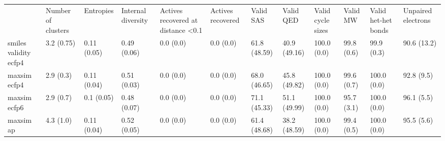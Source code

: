 \begin{tabular}{llllllllllll}
 & Number of clusters & Entropies & Internal diversity & Actives recovered at distance <0.1 & Actives recovered & Valid SAS & Valid QED & Valid cycle sizes & Valid MW & Valid het-het bonds & Unpaired electrons \\
smiles validity ecfp4 & {\cellcolor[HTML]{F2FAFC}} \color[HTML]{000000} 3.2 (0.75) & {\cellcolor[HTML]{F1FAFC}} \color[HTML]{000000} 0.11 (0.05) & {\cellcolor[HTML]{54B88E}} \color[HTML]{F1F1F1} 0.49 (0.06) & {\cellcolor[HTML]{F7FCFD}} \color[HTML]{000000} 0.0 (0.0) & {\cellcolor[HTML]{F7FCFD}} \color[HTML]{000000} 0.0 (0.0) & {\cellcolor[HTML]{43AF78}} \color[HTML]{F1F1F1} 61.8 (48.59) & {\cellcolor[HTML]{8CD2BF}} \color[HTML]{000000} 40.9 (49.16) & {\cellcolor[HTML]{00441B}} \color[HTML]{F1F1F1} 100.0 (0.0) & {\cellcolor[HTML]{2B9452}} \color[HTML]{F1F1F1} 99.8 (0.6) & {\cellcolor[HTML]{00441B}} \color[HTML]{F1F1F1} 99.9 (0.3) & {\cellcolor[HTML]{004D1F}} \color[HTML]{F1F1F1} 90.6 (13.2) \\
maxsim ecfp4 & {\cellcolor[HTML]{F3FAFC}} \color[HTML]{000000} 2.9 (0.3) & {\cellcolor[HTML]{E5F5F9}} \color[HTML]{000000} 0.11 (0.04) & {\cellcolor[HTML]{56BA91}} \color[HTML]{F1F1F1} 0.51 (0.03) & {\cellcolor[HTML]{F7FCFD}} \color[HTML]{000000} 0.0 (0.0) & {\cellcolor[HTML]{F7FCFD}} \color[HTML]{000000} 0.0 (0.0) & {\cellcolor[HTML]{339E60}} \color[HTML]{F1F1F1} 68.0 (46.65) & {\cellcolor[HTML]{77C9B0}} \color[HTML]{000000} 45.8 (49.82) & {\cellcolor[HTML]{00441B}} \color[HTML]{F1F1F1} 100.0 (0.0) & {\cellcolor[HTML]{238B45}} \color[HTML]{F1F1F1} 99.6 (0.7) & {\cellcolor[HTML]{00441B}} \color[HTML]{F1F1F1} 100.0 (0.0) & {\cellcolor[HTML]{004A1E}} \color[HTML]{F1F1F1} 92.8 (9.5) \\
maxsim ecfp6 & {\cellcolor[HTML]{F3FAFC}} \color[HTML]{000000} 2.9 (0.7) & {\cellcolor[HTML]{F0F9FB}} \color[HTML]{000000} 0.1 (0.05) & {\cellcolor[HTML]{61BF9E}} \color[HTML]{000000} 0.48 (0.07) & {\cellcolor[HTML]{F7FCFD}} \color[HTML]{000000} 0.0 (0.0) & {\cellcolor[HTML]{F7FCFD}} \color[HTML]{000000} 0.0 (0.0) & {\cellcolor[HTML]{2C9553}} \color[HTML]{F1F1F1} 71.1 (45.33) & {\cellcolor[HTML]{63C0A0}} \color[HTML]{000000} 51.1 (49.99) & {\cellcolor[HTML]{00441B}} \color[HTML]{F1F1F1} 100.0 (0.0) & {\cellcolor[HTML]{2A9350}} \color[HTML]{F1F1F1} 95.7 (3.1) & {\cellcolor[HTML]{00441B}} \color[HTML]{F1F1F1} 100.0 (0.0) & {\cellcolor[HTML]{004C1E}} \color[HTML]{F1F1F1} 96.1 (5.5) \\
maxsim ap & {\cellcolor[HTML]{F1FAFC}} \color[HTML]{000000} 4.3 (1.0) & {\cellcolor[HTML]{E7F6F9}} \color[HTML]{000000} 0.11 (0.04) & {\cellcolor[HTML]{55B98F}} \color[HTML]{F1F1F1} 0.52 (0.05) & {\cellcolor[HTML]{F7FCFD}} \color[HTML]{000000} 0.0 (0.0) & {\cellcolor[HTML]{F7FCFD}} \color[HTML]{000000} 0.0 (0.0) & {\cellcolor[HTML]{44AF79}} \color[HTML]{F1F1F1} 61.4 (48.68) & {\cellcolor[HTML]{97D7C7}} \color[HTML]{000000} 38.2 (48.59) & {\cellcolor[HTML]{00441B}} \color[HTML]{F1F1F1} 100.0 (0.0) & {\cellcolor[HTML]{268F4A}} \color[HTML]{F1F1F1} 99.4 (0.5) & {\cellcolor[HTML]{00471C}} \color[HTML]{F1F1F1} 100.0 (0.0) & {\cellcolor[HTML]{00491D}} \color[HTML]{F1F1F1} 95.5 (5.6) \\

\end{tabular}
